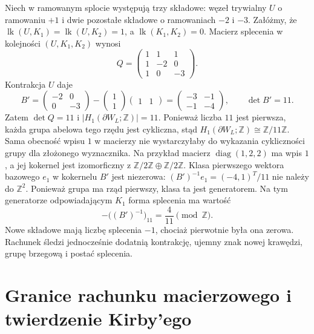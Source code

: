\begin{przyklad}
\label{ex:tg-kirby-positive-blowdown}
Niech w ramowanym splocie występują trzy składowe:
węzeł trywialny $U$ o ramowaniu $+1$ i dwie
pozostałe składowe o ramowaniach
$-2$ i $-3$. Załóżmy, że
$\operatorname{lk}(U,K_1)=\operatorname{lk}(U,K_2)=1$,
a $\operatorname{lk}(K_1,K_2)=0$.
Macierz splecenia w kolejności $(U,K_1,K_2)$ wynosi
\[
Q=\begin{pmatrix}
1&1&1\\
1&-2&0\\
1&0&-3
\end{pmatrix}.
\]
Kontrakcja $U$ daje
\[
B'=
\begin{pmatrix}-2&0\\0&-3\end{pmatrix}
-\begin{pmatrix}1\\1\end{pmatrix}
\begin{pmatrix}1&1\end{pmatrix}
=\begin{pmatrix}-3&-1\\-1&-4\end{pmatrix},
\qquad \det B'=11.
\]
Zatem $\det Q=11$ i
$|H_1(\partial W_L;\mathbb Z)|=11$.
Ponieważ liczba $11$ jest pierwsza,
każda grupa abelowa tego rzędu jest cykliczna,
stąd $H_1(\partial W_L;\mathbb Z)\cong
\mathbb Z/11\mathbb Z$.
Sama obecność wpisu $1$ w macierzy
nie wystarczyłaby do wykazania cykliczności
grupy dla złożonego wyznacznika.
Na przykład macierz
$\operatorname{diag}(1,2,2)$ ma wpis $1$,
a jej kokernel jest izomorficzny z
$\mathbb Z/2\mathbb Z\oplus\mathbb Z/2\mathbb Z$.
Klasa pierwszego wektora bazowego $e_1$
w kokernelu $B'$ jest niezerowa:
$(B')^{-1}e_1=(-4,1)^T/11$ nie należy
do $\mathbb Z^2$. Ponieważ grupa ma rząd
pierwszy, klasa ta jest generatorem.
Na tym generatorze odpowiadającym $K_1$
forma splecenia ma wartość
\[
-\bigl((B')^{-1}\bigr)_{11}
=\frac4{11}\pmod{\mathbb Z}.
\]
Nowe składowe mają liczbę splecenia $-1$,
chociaż pierwotnie była ona zerowa.
Rachunek śledzi jednocześnie dodatnią
kontrakcję, ujemny znak nowej krawędzi,
grupę brzegową i postać splecenia.
\end{przyklad}

\section{Granice rachunku macierzowego i twierdzenie Kirby'ego}
\label{sec:tg-kirby-scope}

